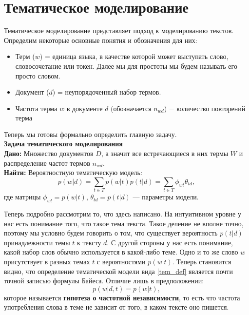 \section{Тематическое моделирование}
Тематическое моделирование представляет подход к моделированию текстов. Определим некоторые основные понятия и обозначения для них:
\begin{itemize}
    \item Терм ($w$) = единица языка, в качестве которой может выступать слово, словосочетание или токен. Далее мы для простоты мы будем называть его просто словом.
    \item Документ ($d$) = неупорядоченный набор термов.
    \item Частота терма $w$ в документе $d$ (обозначается $n_{wd}$) = количество повторений терма
\end{itemize}
Теперь мы готовы формально определить главную задачу.\\
\textbf{Задача тематического моделирования}\\
\textbf{Дано:} Множество документов $D$, а значит все встречающиеся в них термы $W$ и распределение частот термов $n_{wd}$.\\
\textbf{Найти:} Вероятностную тематическую модель:
\begin{equation}\label{tem_def}
    p(w|d) = \sum\limits_{t\in T} p(w|t) p(t|d) = \sum\limits_{t\in T} \phi_{wt} \theta_{td},
\end{equation}
где матрицы $\phi_{wt} = p(w|t)$,  $\theta_{td} = p(t|d)$ --- параметры модели.

Теперь подробно рассмотрим то, что здесь написано. На интуитивном уровне у нас есть понимание того, что такое тема текста. Такое деление не вполне точно, поэтому мы условно будем говорить о том, что существует вероятность $p(t|d)$ принадлежности темы $t$ к тексту $d$. С другой стороны у нас есть понимание, какой набор слов обычно используется в какой-либо теме. Одно и то же слово $w$ присутствует в разных темах $t$ с вероятностями $p(w|t)$. Теперь становится видно, что определение тематической модели вида \eqref{tem_def} является почти точной записью формулы Байеса. Отличие лишь в предположении:
\begin{equation}
    p(w|d,t) = p(w|t),
\end{equation}
которое называется \textbf{гипотеза о частотной независимости}, то есть что частота употребления слова в теме не зависит от того, в каком тексте оно пишется.

